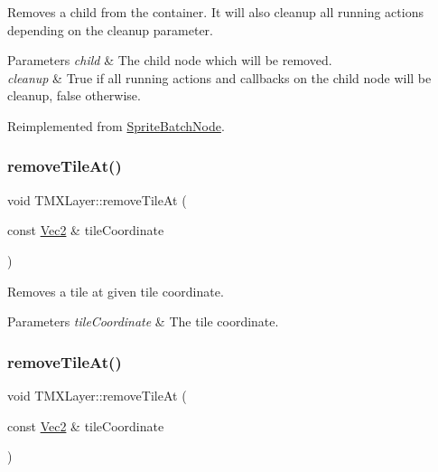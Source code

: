 Removes a child from the container. It will also cleanup all running actions depending on the cleanup parameter.


\begin{DoxyParams}{Parameters}
{\em child} & The child node which will be removed. \\
\hline
{\em cleanup} & True if all running actions and callbacks on the child node will be cleanup, false otherwise. \\
\hline
\end{DoxyParams}


Reimplemented from \hyperlink{classSpriteBatchNode_a7bebdfd28805ed83d0a78b49f8b52803}{Sprite\+Batch\+Node}.

\mbox{\label{classTMXLayer_a185ae1ff2a7ce7069e67362fb1faa930}} 
\subsubsection{\texorpdfstring{remove\+Tile\+At()}{removeTileAt()}\hspace{0.1cm}{\footnotesize\ttfamily [1/2]}}
{\footnotesize\ttfamily void T\+M\+X\+Layer\+::remove\+Tile\+At (\begin{DoxyParamCaption}\item[{const \hyperlink{classVec2}{Vec2} \&}]{tile\+Coordinate }\end{DoxyParamCaption})}

Removes a tile at given tile coordinate.


\begin{DoxyParams}{Parameters}
{\em tile\+Coordinate} & The tile coordinate. \\
\hline
\end{DoxyParams}
\mbox{\label{classTMXLayer_a185ae1ff2a7ce7069e67362fb1faa930}} 
\subsubsection{\texorpdfstring{remove\+Tile\+At()}{removeTileAt()}\hspace{0.1cm}{\footnotesize\ttfamily [2/2]}}
{\footnotesize\ttfamily void T\+M\+X\+Layer\+::remove\+Tile\+At (\begin{DoxyParamCaption}\item[{const \hyperlink{classVec2}{Vec2} \&}]{tile\+Coordinate }\end{DoxyParamCaption})}

